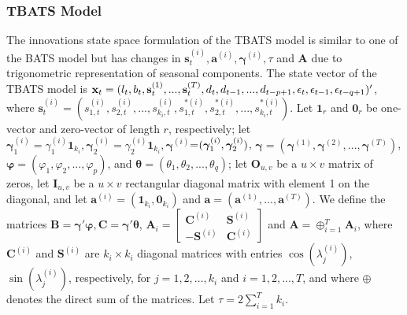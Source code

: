 \documentclass{uwstat572}
\begin{document}
\subsubsection{TBATS Model}
\hspace{4ex}The innovations state space formulation of the TBATS model is similar to one of the BATS model but has changes in $\textbf{s}_t^{(i)}, \textbf{a}^{(i)}, \bm{\gamma}^{(i)}, \tau$ and $\textbf{A}$ due to trigonometric representation of seasonal components. The state vector of the TBATS model is $\textbf{x}_t=(l_t,b_t,\textbf{s}_t^{(1)},...,\textbf{s}_t^{(T)}, d_t, d_{t-1},\\..., d_{t-p+1},  \epsilon_t, \epsilon_{t-1}, \epsilon_{t-q+1} )'$, 
where $\textbf{s}_t^{(i)}=(s_{1,t}^{(i)},s_{2,t}^{(i)},..., s_{k_i,t}^{(i)}, s_{1,t}^{*(i)},s_{2,t}^{*(i)},...,s_{k_i,t}^{*(i)})$. 
Let $\textbf{1}_r$ and $\textbf{0}_r$ be one-vector and zero-vector of length $r$, respectively; let $\bm{\gamma}_1^{(i)}=\gamma_1^{(i)} \textbf{1}_{k_i}, \bm{\gamma}_2^{(i)}=\gamma_2^{(i)} \textbf{1}_{k_i}, \bm{\gamma}^{(i)}$=$(\bm{\gamma}_1^{(i)},\\ \bm{\gamma}_2^{(i)})$, $\bm{\gamma}=(\bm{\gamma}^{(1)},\bm{\gamma}^{(2)},...,\bm{\gamma}^{(T)})$, $\bm{\varphi}=(\varphi_1, \varphi_2,..., \varphi_p)$, and $\bm{\theta}=(\theta_1,\theta_2,...,\theta_q)$; let $\textbf{O}_{u,v}$ be a $u \times v$ matrix of zeros, let $\textbf{I}_{u,v}$ be a $u \times v$ rectangular diagonal matrix with element 1 on the diagonal, and let $\textbf{a}^{(i)}=(\textbf{1}_{k_i},\textbf{0}_{k_i})$ and $\textbf{a}=(\textbf{a}^{(1)},...,\textbf{a}^{(T)})$. We define the matrices $\textbf{B}=\bm{\gamma}'\bm{\varphi}, \textbf{C}=\bm{\gamma}'\bm{\theta}$, $\textbf{A}_i=\begin{bmatrix} 
\textbf{C}^{(i)} &\textbf{S}^{(i)}  \\ 
-\textbf{S}^{(i)}  &\textbf{C}^{(i)} 
\end{bmatrix}$ and $\textbf{A}=\oplus _{i=1}^T \textbf{A}_i$, where $\textbf{C}^{(i)}$ and $\textbf{S}^{(i)}$ are $k_i \times k_i$ diagonal matrices with entries $\cos (\lambda^{(i)}_j) $, $\sin (\lambda^{(i)}_j) $, respectively, for $j=1,2,...,k_i$ and $i=1,2,...,T$, and where $\oplus$ denotes the direct sum of the matrices. Let $\tau=2\sum_{i=1}^{T} k_i$. 
\end{document}
